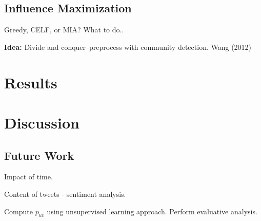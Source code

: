 \documentclass[sigconf]{acmart}
\begin{document}
\subsection{Influence Maximization}

Greedy, CELF, or MIA? What to do..

\textbf{Idea:} Divide and conquer--preprocess with community detection. Wang (2012)

\section{Results} 

\section{Discussion}

\subsection{Future Work}

Impact of time. 

Content of tweets - sentiment analysis. 

Compute $p_{uv}$ using unsupervised learning approach. Perform evaluative analysis. 



\end{document}
